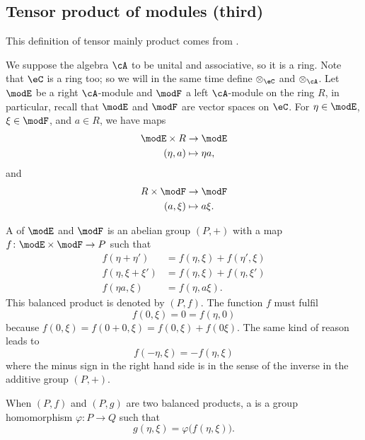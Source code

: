 \subsection{Tensor product of modules (third)}

This definition of tensor mainly product comes from \cite{Jacobson_alg}.

We suppose the algebra $\cA$ to be unital and associative, so it is a ring. Note that $\eC$ is a ring too; so we will in the same time define $\otimes_{\eC}$ and $\otimes_{\cA}$. Let $\modE$ be a right $\cA$-module and $\modF$ a left $\cA$-module on the ring $R$, in particular, recall that $\modE$ and $\modF$ are vector spaces on $\eC$. For $\eta\in\modE$, $\xi\in\modF$, and $a\in R$, we have maps
\begin{equation}
\begin{aligned}
 \modE\times R&\to \modE \\ 
(\eta,a)&\mapsto \eta a, 
\end{aligned}
\end{equation} 
and
\begin{equation}
\begin{aligned}
 R\times\modF&\to \modF \\ 
(a,\xi)&\mapsto a\xi. 
\end{aligned}
\end{equation}

A  of $\modE$ and $\modF$ is an abelian group $(P,+)$ with a map $f\colon \modE\times\modF\to P$ such that 
\begin{subequations}
\begin{align}
  f(\eta+\eta')&=f(\eta,\xi)+f(\eta',\xi)\\
f(\eta,\xi+\xi')&=f(\eta,\xi)+f(\eta,\xi')\\
f(\eta a,\xi)&=f(\eta,a\xi).
\end{align}
\end{subequations}
This balanced product is denoted by $(P,f)$. The function $f$ must fulfil
\[ 
  f(0,\xi)=0=f(\eta,0)
\]
because $f(0,\xi)=f(0+0,\xi)=f(0,\xi)+f(0\xi)$. The same kind of reason leads to
\[ 
  f(-\eta,\xi)=-f(\eta,\xi)
\]
where the minus sign in the right hand side is in the sense of the inverse in the additive group $(P,+)$.

When $(P,f)$ and $(P,g)$ are two balanced products, a  is a group homomorphism $\varphi\colon P\to Q$ such that
\[ 
  g(\eta,\xi)=\varphi\big( f(\eta,\xi) \big).
\]


